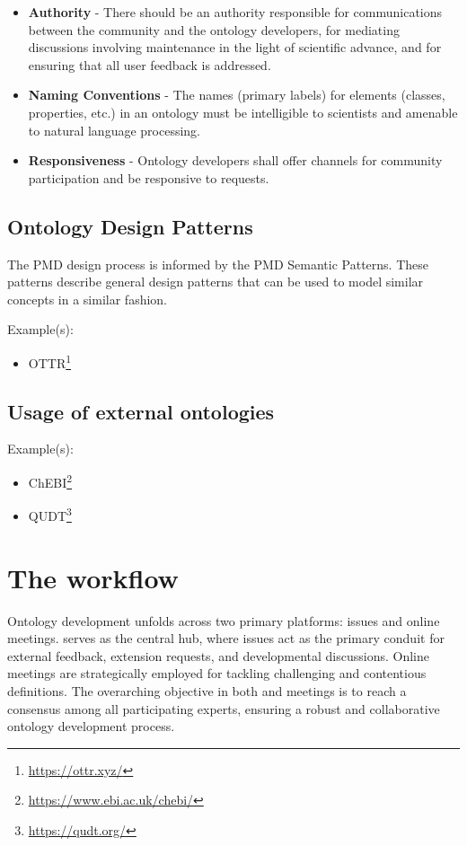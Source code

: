 \begin{itemize}
    \item \textbf{Authority} - There should be an authority responsible for communications between the community and the ontology developers, for mediating discussions involving maintenance in the light of scientific advance, and for ensuring that all user feedback is addressed.
    \item \textbf{Naming Conventions} - The names (primary labels) for elements (classes, properties, etc.) in an ontology must be intelligible to scientists and amenable to natural language processing.
    \item \textbf{Responsiveness} - Ontology developers shall offer channels for community participation and be responsive to requests.
\end{itemize}

\subsection{Ontology Design Patterns}

The PMD design process is informed by the PMD Semantic Patterns. These patterns describe general design patterns that can be used to model similar concepts in a similar fashion. 

Example(s): 
\begin{itemize}
    \item OTTR\footnote{\url{https://ottr.xyz/}}
\end{itemize}

\subsection{Usage of external ontologies}

Example(s): 
\begin{itemize}
    \item ChEBI\footnote{\url{https://www.ebi.ac.uk/chebi/}}
    \item QUDT\footnote{\url{https://qudt.org/}}
\end{itemize}

\section{The {\github} workflow}

Ontology development unfolds across two primary platforms: {\github} issues and online meetings. {\github}  serves as the central hub, where issues act as the primary conduit for external feedback, extension requests, and developmental discussions. Online meetings are strategically employed for tackling challenging and contentious definitions. The overarching objective in both {\github}  and meetings is to reach a consensus among all participating experts, ensuring a robust and collaborative ontology development process.

